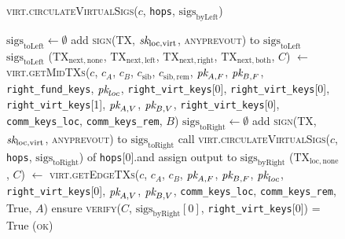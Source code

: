 \begin{figure}[H]
\begin{processbox}{\textsc{virt.circulateVirtualSigs}($c$, \texttt{hops},
  $\mathrm{sigs}_{\mathrm{byLeft}}$)}
\begin{algorithmic}[1]
          \State $\mathrm{sigs}_{\mathrm{toLeft}} \gets \emptyset$
            \State add \textsc{sign}(TX, $\textit{sk}_{\mathrm{loc}, \mathrm{virt}}$,
            \textsc{anyprevout}) to $\mathrm{sigs}_{\mathrm{toLeft}}$
          \EndFor
          \State \Return $\mathrm{sigs}_{\mathrm{toLeft}}$
        \EndIf
      \Else \: 
        \State ($\mathrm{TX}_{\mathrm{next}, \mathrm{none}}$,
        $\mathrm{TX}_{\mathrm{next}, \mathrm{left}}$,
        $\mathrm{TX}_{\mathrm{next}, \mathrm{right}}$,
        $\mathrm{TX}_{\mathrm{next}, \mathrm{both}}$, $C$) $\gets$
        \textsc{virt.getMidTXs}($c$, $c_A$, $c_B$, $c_{\mathrm{sib}}$,
        $c_{\mathrm{sib}, \mathrm{rem}}$, $\textit{pk}_{A, F}$, $\textit{pk}_{B, F}$,
        \texttt{right\_fund\_keys}, $\textit{pk}_{loc}$, \texttt{right\_virt\_keys}[0],
        \texttt{right\_virt\_keys}[0], \texttt{right\_virt\_keys}[1], $\textit{pk}_{A,
        V}$, $\textit{pk}_{B, V}$, \texttt{right\_virt\_keys}[0],
        \texttt{comm\_keys\_loc}, \texttt{comm\_keys\_rem}, $B$)
        \State $\mathrm{sigs}_{\mathrm{toRight}} \gets \emptyset$
          \State add \textsc{sign}(TX, $\textit{sk}_{\mathrm{loc}, \mathrm{virt}}$,
          \textsc{anyprevout}) to $\mathrm{sigs}_{\mathrm{toRight}}$
        \EndFor
        \State call \textsc{virt.circulateVirtualSigs}($c$, \texttt{hops},
        $\mathrm{sigs}_{\mathrm{toRight}}$) of \texttt{hops}[0].\bob and
        assign output to $\mathrm{sigs}_{\mathrm{byRight}}$
        \State ($\mathrm{TX}_{\mathrm{loc}, \mathrm{none}}$, $C$) $\gets$
        \textsc{virt.getEdgeTXs}($c$, $c_A$, $c_B$, $\textit{pk}_{A, F}$, $\textit{pk}_{B, F}$,
        $\textit{pk}_{loc}$, \texttt{right\_virt\_keys}[0], $\textit{pk}_{A, V}$, $\textit{pk}_{B, V}$,
        \texttt{comm\_keys\_loc}, \texttt{comm\_keys\_rem}, True, $A$)
        \State ensure \textsc{verify}($C$,
        $\mathrm{sigs}_{\mathrm{byRight}}[0]$, \texttt{right\_virt\_keys}[0]) =
        True
        \State \Return (\textsc{ok})
      \EndIf
    \end{algorithmic}
  \end{processbox}
  \caption{}
  \label{code:virtual-layer:virtual-sigs}
\end{figure}

